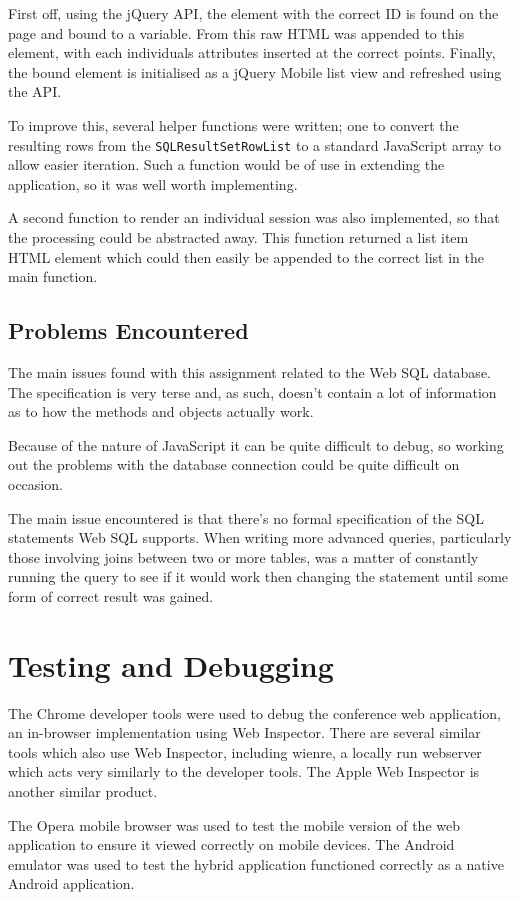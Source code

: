 \documentclass[11pt, a4paper]{article}
\begin{document}
First off, using the jQuery API, the element with the correct ID is found on 
the page and bound to a variable. From this raw HTML was appended to this
element, with each individuals attributes inserted at the correct points.
Finally, the bound element is initialised as a jQuery Mobile list view and
refreshed using the API.

To improve this, several helper functions were written; one to convert the
resulting rows from the \texttt{SQLResultSetRowList} to a standard JavaScript
array to allow easier iteration. Such a function would be of use in extending
the application, so it was well worth implementing.

A second function to render an individual session was also implemented, so that
the processing could be abstracted away. This function returned a list item 
HTML element which could then easily be appended to the correct list in the
main function.

\subsection{Problems Encountered}
The main issues found with this assignment related to the Web SQL database. The
specification is very terse and, as such, doesn't contain a lot of information
as to how the methods and objects actually work.

Because of the nature of JavaScript it can be quite difficult to debug, so
working out the problems with the database connection could be quite difficult
on occasion.

The main issue encountered is that there's no formal specification of the SQL
statements Web SQL supports. When writing more advanced queries, particularly
those involving joins between two or more tables, was a matter of constantly
running the query to see if it would work then changing the statement until
some form of correct result was gained.

\section{Testing and Debugging}
The Chrome developer tools were used to debug the conference web application,
an in-browser implementation using Web Inspector. 
There are several similar tools which also use Web Inspector, including wienre,
a locally run webserver which acts very similarly to the developer tools. The
Apple Web Inspector is another similar product.

The Opera mobile browser was used to test the mobile version of the web
application to ensure it viewed correctly on mobile devices. 
The Android emulator was used to test the hybrid application functioned
correctly as a native Android application.
\end{document}
